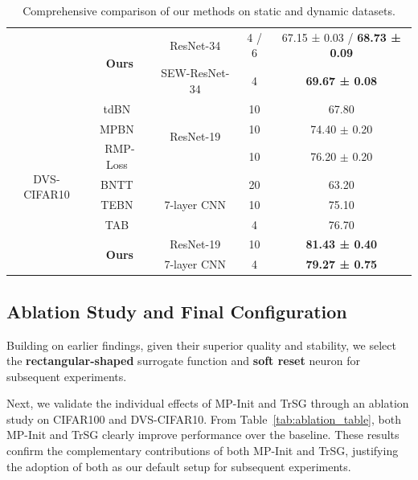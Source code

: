 \begin{table}[t!]
\begin{tabular}{ccccc}
\addlinespace[1pt]
\cline{2-5}
\addlinespace[1pt]
& \multirow{2}{*}{\textbf{Ours}} & ResNet-34 & 4 / 6 & 67.15 ± 0.03 / \textbf{68.73 ± 0.09} \\
& & SEW-ResNet-34 & 4 & \textbf{69.67 ± 0.08} \\
\midrule
\multirow{8}{*}{DVS-CIFAR10} & tdBN~\cite{zheng:2021} & \multirow{3}{*}{ResNet-19} & 10 & 67.80 \\
& MPBN~\cite{guo:2023_2} & & 10 & 74.40 $\pm$ 0.20 \\
& RMP-Loss~\cite{guo:2023} & & 10 & 76.20 $\pm$ 0.20 \\
\addlinespace[1pt]
\cline{2-5}
\addlinespace[1pt]
& BNTT~\cite{bntt:2020} & \multirow{3}{*}{7-layer CNN} & 20 & 63.20 \\
& TEBN~\cite{tebn:2022} & & 10 & 75.10 \\
& TAB~\cite{tab:2024} & & 4 & 76.70 \\
\addlinespace[1pt]
\cline{2-5}
\addlinespace[1pt]
& \multirow{2}{*}{\textbf{Ours}} & ResNet-19 & 10 & \textbf{81.43 ± 0.40} \\
&  & 7-layer CNN & 4 & \textbf{79.27 ± 0.75} \\
\bottomrule
\end{tabular}
\vspace{-1em}
\caption{Comprehensive comparison of our methods on static and dynamic datasets.}
\label{tab:comprehensive_results}
\vspace{-0.6em}
\end{table}

\subsection{Ablation Study and Final Configuration}
\label{subsec:ablation_and_config}

Building on earlier findings, given their superior quality and stability, we select the \textbf{rectangular-shaped} surrogate function and \textbf{soft reset} neuron for subsequent experiments. 

Next, we validate the individual effects of MP-Init and TrSG through an ablation study on CIFAR100 and DVS-CIFAR10. From Table~\ref{tab:ablation_table}, both MP-Init and TrSG clearly improve performance over the baseline. These results confirm the complementary contributions of both MP-Init and TrSG, justifying the adoption of both as our default setup for subsequent experiments.

